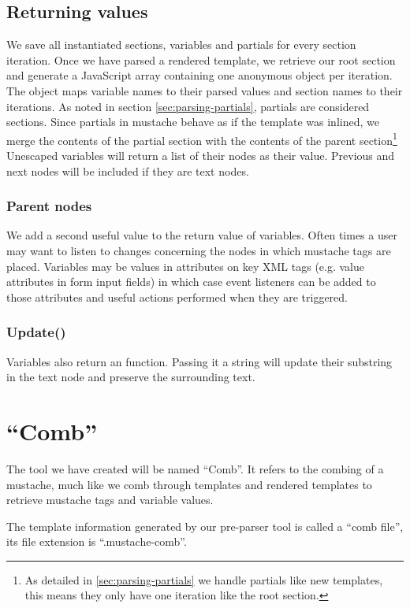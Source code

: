 \documentclass[thesis.tex]{subfiles}
\begin{document}
\subsection{Returning values}
We save all instantiated sections, variables and partials for every section
iteration. Once we have parsed a rendered template, we retrieve our root section
and generate a JavaScript array containing one anonymous object per iteration.
The object maps variable names to their parsed values and section names to their
iterations.
As noted in section \ref{sec:parsing-partials}, partials are considered
sections. Since partials in mustache behave as if the template was inlined,
we merge the contents of the partial section with the contents of the
parent section\footnote{
	As detailed in \ref{sec:parsing-partials} we handle partials like new
	templates, this means they only have one iteration like the root section.
}
Unescaped variables will return a list of their nodes as their value.
Previous and next nodes will be included if they are text nodes.

\subsubsection{Parent nodes}
\label{sec:parent-nodes}
We add a second useful value to the return value of variables. Often times a
user may want to listen to changes concerning the nodes in which mustache tags
are placed. Variables may be values in attributes on key XML tags
(e.g. value attributes in form input fields) in which case event listeners can
be added to those attributes and useful actions performed when they are
triggered.

\subsubsection{Update()}
\label{sec:update}
Variables also return an  function. Passing it a string
will update their substring in the text node and preserve the surrounding text.

\section{``Comb''}
The tool we have created will be named ``Comb''. It refers to the combing of
a mustache, much like we comb through templates and rendered templates to
retrieve mustache tags and variable values.

The template information generated by our pre-parser tool is called a
``comb file'', its file extension is ``.mustache-comb''.
\end{document}
